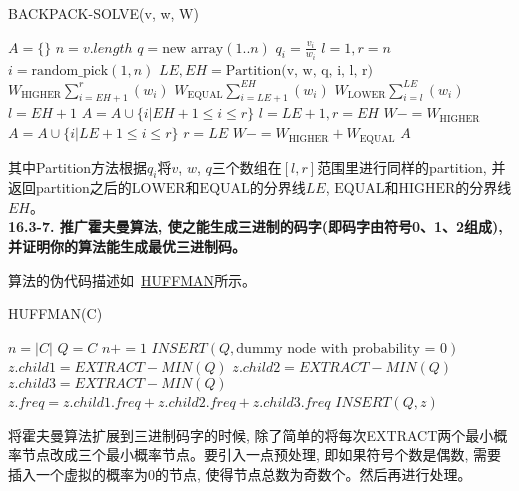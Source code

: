 \documentclass[paper=a4, fontsize=11pt]{scrartcl} %
\numberwithin{equation}{section} %
\numberwithin{figure}{section} %
\numberwithin{table}{section} %
\begin{document}
\begin{algorithm}[ht]
  \caption{BACKPACK-SOLVE(v, w, W)}
  \label{algo:backpack}
  \begin{algorithmic}[1]
    \State $A = \{\}$
    \State $n = v.length$
    \State $q = \mbox{new array}(1..n)$
    \State $q_i = \frac{v_i}{w_i}$
    \EndFor
    \State $l = 1, r = n$
    \State $i = \mbox{random\_pick}(1, n)$
    \State $LE, EH = \mbox{Partition(v, w, q, i, l, r)}$ 
    \State $W_{\mbox{HIGHER}}\sum_{i=EH+1}^{r}(w_i)$
    \State $W_{\mbox{EQUAL}}\sum_{i=LE+1}^{EH}(w_i)$
    \State $W_{\mbox{LOWER}}\sum_{i=l}^{LE}(w_i)$
    \State $l = EH + 1$
    \State $A = A \cup \{i | EH + 1 \leq i \leq r\}$
    \State $l = LE + 1, r = EH$
    \State $W -= W_{\mbox{HIGHER}}$
    \Else
    \State $A = A \cup \{i | LE + 1 \leq i \leq r\}$
    \State $r = LE$
    \State $W -= W_{\mbox{HIGHER}} + W_{\mbox{EQUAL}}$
    \EndIf
    \EndWhile
    \State\Return $A$
  \end{algorithmic}
\end{algorithm}

其中Partition方法根据$q_i$将$v$, $w$, $q$三个数组在$[l, r]$范围里进行同样的partition, 并返回partition之后的$\mbox{LOWER}$和$\mbox{EQUAL}$的分界线$LE$, $\mbox{EQUAL}$和$\mbox{HIGHER}$的分界线$EH$。
\\[4ex]

\textbf{16.3-7. 推广霍夫曼算法, 使之能生成三进制的码字(即码字由符号0、1、2组成), 并证明你的算法能生成最优三进制码。}

算法的伪代码描述如~\hyperref[algo:huffman]{HUFFMAN}所示。
\begin{algorithm}[ht]
  \caption{HUFFMAN(C)}
  \label{algo:huffman}
  \begin{algorithmic}[1]
    \State $n = |C|$
    \State $Q = C$
    \State $n += 1$
    \State $INSERT(Q, \mbox{dummy node with probability = 0})$
    \EndIf
    \State $z.child1 = EXTRACT-MIN(Q)$
    \State $z.child2 =  EXTRACT-MIN(Q)$
    \State $z.child3 = EXTRACT-MIN(Q)$
    \State $z.freq = z.child1.freq + z.child2.freq + z.child3.freq$
    \State $INSERT(Q, z)$
    \EndWhile
  \end{algorithmic}
\end{algorithm}

将霍夫曼算法扩展到三进制码字的时候, 除了简单的将每次EXTRACT两个最小概率节点改成三个最小概率节点。要引入一点预处理, 即如果符号个数是偶数, 需要插入一个虚拟的概率为0的节点, 使得节点总数为奇数个。然后再进行处理。
\end{document}
